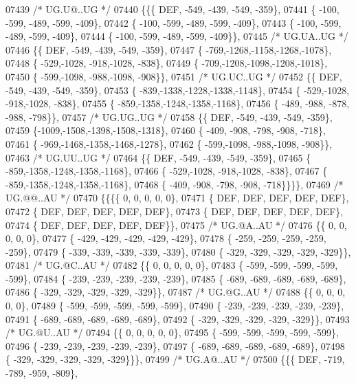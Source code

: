 \begin{DoxyCode}
07439 \textcolor{comment}{/* UG.U@..UG */}
07440 \{\{\{  DEF, -549, -439, -549, -359\},
07441 \{ -100, -599, -489, -599, -409\},
07442 \{ -100, -599, -489, -599, -409\},
07443 \{ -100, -599, -489, -599, -409\},
07444 \{ -100, -599, -489, -599, -409\}\},
07445 \textcolor{comment}{/* UG.UA..UG */}
07446 \{\{  DEF, -549, -439, -549, -359\},
07447 \{ -769,-1268,-1158,-1268,-1078\},
07448 \{ -529,-1028, -918,-1028, -838\},
07449 \{ -709,-1208,-1098,-1208,-1018\},
07450 \{ -599,-1098, -988,-1098, -908\}\},
07451 \textcolor{comment}{/* UG.UC..UG */}
07452 \{\{  DEF, -549, -439, -549, -359\},
07453 \{ -839,-1338,-1228,-1338,-1148\},
07454 \{ -529,-1028, -918,-1028, -838\},
07455 \{ -859,-1358,-1248,-1358,-1168\},
07456 \{ -489, -988, -878, -988, -798\}\},
07457 \textcolor{comment}{/* UG.UG..UG */}
07458 \{\{  DEF, -549, -439, -549, -359\},
07459 \{-1009,-1508,-1398,-1508,-1318\},
07460 \{ -409, -908, -798, -908, -718\},
07461 \{ -969,-1468,-1358,-1468,-1278\},
07462 \{ -599,-1098, -988,-1098, -908\}\},
07463 \textcolor{comment}{/* UG.UU..UG */}
07464 \{\{  DEF, -549, -439, -549, -359\},
07465 \{ -859,-1358,-1248,-1358,-1168\},
07466 \{ -529,-1028, -918,-1028, -838\},
07467 \{ -859,-1358,-1248,-1358,-1168\},
07468 \{ -409, -908, -798, -908, -718\}\}\}\},
07469 \textcolor{comment}{/* UG.@@..AU */}
07470 \{\{\{\{    0,    0,    0,    0,    0\},
07471 \{  DEF,  DEF,  DEF,  DEF,  DEF\},
07472 \{  DEF,  DEF,  DEF,  DEF,  DEF\},
07473 \{  DEF,  DEF,  DEF,  DEF,  DEF\},
07474 \{  DEF,  DEF,  DEF,  DEF,  DEF\}\},
07475 \textcolor{comment}{/* UG.@A..AU */}
07476 \{\{    0,    0,    0,    0,    0\},
07477 \{ -429, -429, -429, -429, -429\},
07478 \{ -259, -259, -259, -259, -259\},
07479 \{ -339, -339, -339, -339, -339\},
07480 \{ -329, -329, -329, -329, -329\}\},
07481 \textcolor{comment}{/* UG.@C..AU */}
07482 \{\{    0,    0,    0,    0,    0\},
07483 \{ -599, -599, -599, -599, -599\},
07484 \{ -239, -239, -239, -239, -239\},
07485 \{ -689, -689, -689, -689, -689\},
07486 \{ -329, -329, -329, -329, -329\}\},
07487 \textcolor{comment}{/* UG.@G..AU */}
07488 \{\{    0,    0,    0,    0,    0\},
07489 \{ -599, -599, -599, -599, -599\},
07490 \{ -239, -239, -239, -239, -239\},
07491 \{ -689, -689, -689, -689, -689\},
07492 \{ -329, -329, -329, -329, -329\}\},
07493 \textcolor{comment}{/* UG.@U..AU */}
07494 \{\{    0,    0,    0,    0,    0\},
07495 \{ -599, -599, -599, -599, -599\},
07496 \{ -239, -239, -239, -239, -239\},
07497 \{ -689, -689, -689, -689, -689\},
07498 \{ -329, -329, -329, -329, -329\}\}\},
07499 \textcolor{comment}{/* UG.A@..AU */}
07500 \{\{\{  DEF, -719, -789, -959, -809\},

\end{DoxyCode}
